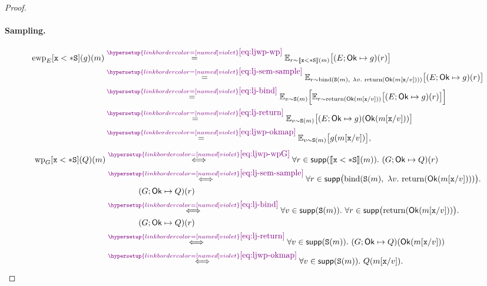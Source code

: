 \documentclass[acmsmall,natbib,review,screen,anonymous,10pt]{acmart}
\makeatletter
\let\@msm@th@eqref\eqref
\renewcommand{\eqref}[1]{%
  \begingroup
  \leavevmode
  \color{violet}%
  \hypersetup{linkbordercolor=[named]{violet}}%
  \@msm@th@eqref{#1}%
  \endgroup
}
\makeatother
\begin{document}
\begin{proof}
\paragraph{Sampling.}
\[
  \begin{aligned}
  \mathrm{ewp}_{E}[\vx <* \sexpr](g)(m)
  &\overset{\eqref{eq:ljwp-wp}}{=}
  \mathbb E_{r\sim\llbracket\vx <* \sexpr\rrbracket(m)}
  \bigl[(E;\mathsf{Ok}\mapsto g)(r)\bigr]\\
  &\overset{\eqref{eq:lj-sem-sample}}{=}
  \mathbb E_{r\sim\operatorname{bind}(\sexpr(m),\
    \lambda v.\,\operatorname{return}(\mathsf{Ok}(m[\vx\mapped v])))}
  \bigl[(E;\mathsf{Ok}\mapsto g)(r)\bigr]\\
  &\overset{\eqref{eq:lj-bind}}{=}
  \mathbb E_{v\sim\sexpr(m)}\Bigl[
  \mathbb E_{r\sim\operatorname{return}(\mathsf{Ok}(m[\vx\mapped v]))}
  \bigl[(E;\mathsf{Ok}\mapsto g)(r)\bigr]\Bigr]\\
  &\overset{\eqref{eq:lj-return}}{=}
  \mathbb E_{v\sim\sexpr(m)}\bigl[
  (E;\mathsf{Ok}\mapsto g)(\mathsf{Ok}(m[\vx\mapped v]))\bigr]\\
  &\overset{\eqref{eq:ljwp-okmap}}{=}
  \mathbb E_{v\sim\sexpr(m)}\bigl[g(m[\vx\mapped v])\bigr],
  \end{aligned}
\]
\[
  \begin{aligned}
  \mathrm{wp}_{G}[\vx <* \sexpr](Q)(m)
  &\overset{\eqref{eq:ljwp-wpG}}{\iff}
  \forall r\in\supp(\llbracket\vx <* \sexpr\rrbracket(m)).\
  (G;\mathsf{Ok}\mapsto Q)(r)\\
  &\overset{\eqref{eq:lj-sem-sample}}{\iff}
  \forall r\in\supp\bigl(\operatorname{bind}(\sexpr(m),\
    \lambda v.\,\operatorname{return}(\mathsf{Ok}(m[\vx\mapped v])))\bigr).\\
  &\qquad\qquad(G;\mathsf{Ok}\mapsto Q)(r)\\
  &\overset{\eqref{eq:lj-bind}}{\iff}
  \forall v\in\supp(\sexpr(m)).\
  \forall r\in\supp\bigl(\operatorname{return}(\mathsf{Ok}(m[\vx\mapped v]))\bigr).\\
  &\qquad\qquad(G;\mathsf{Ok}\mapsto Q)(r)\\
  &\overset{\eqref{eq:lj-return}}{\iff}
  \forall v\in\supp(\sexpr(m)).\
  (G;\mathsf{Ok}\mapsto Q)(\mathsf{Ok}(m[\vx\mapped v]))\\
  &\overset{\eqref{eq:ljwp-okmap}}{\iff}
  \forall v\in\supp(\sexpr(m)).\ Q(m[\vx\mapped v]).
  \end{aligned}
\]


\end{proof}
\end{document}

